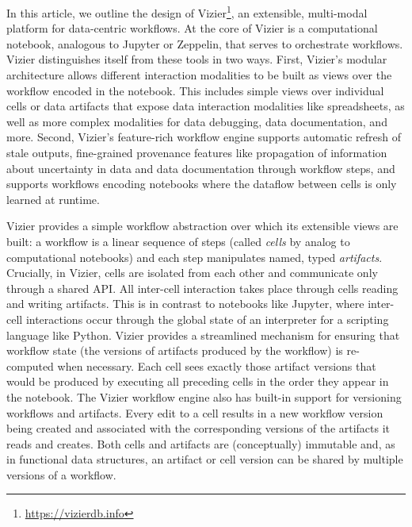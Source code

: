 In this article, we outline the design of Vizier\footnote{\url{https://vizierdb.info}}, an extensible, multi-modal platform for data-centric workflows.
At the core of Vizier is a computational notebook, analogous to Jupyter or Zeppelin, that serves to orchestrate workflows.
Vizier distinguishes itself from these tools in two ways. 
First, Vizier's modular architecture allows different interaction modalities to be built as views over the workflow encoded in the notebook. 
This includes simple views over individual cells or data artifacts that expose data interaction modalities like spreadsheets, as well as more complex modalities for data debugging, data documentation, and more.
Second, Vizier's feature-rich workflow engine supports automatic refresh of stale outputs, fine-grained provenance features like propagation of information about uncertainty in data and data documentation through workflow steps, and supports workflows encoding notebooks where the dataflow between cells is only learned at runtime.

Vizier provides a simple workflow abstraction over which its extensible views are built: a workflow is a linear sequence of steps (called \textit{cells} by analog to computational notebooks) and  each step manipulates named, typed \emph{artifacts}.
Crucially, in Vizier, cells are isolated from each other and communicate only through a shared API.
All inter-cell interaction %
takes place through cells reading and writing artifacts.
This is in contrast to notebooks like Jupyter, where inter-cell interactions occur through the global state of an interpreter for a scripting language like Python.
Vizier provides a streamlined mechanism for ensuring that workflow state (the versions of artifacts produced by the workflow) is re-computed when necessary.
Each cell sees exactly those artifact versions that would be produced by executing all preceding cells in the order they appear in the notebook.
The Vizier workflow engine also has built-in support for versioning workflows and artifacts. 
Every edit to a cell results in a new workflow version being created and associated with the corresponding versions of the artifacts it reads and creates. 
Both cells and artifacts are (conceptually) immutable and, as in functional data structures, an artifact or cell version can be shared by multiple versions of a workflow.


